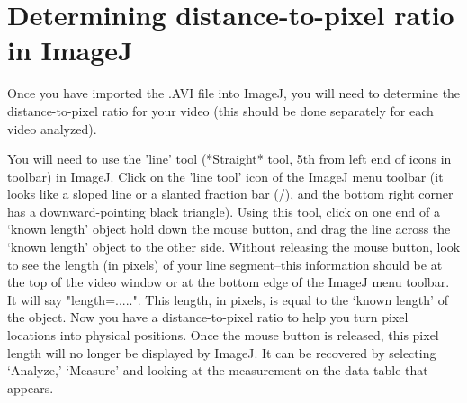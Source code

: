 \section*{Determining distance-to-pixel ratio in ImageJ}
Once you have imported the .AVI file into ImageJ, you will need to determine the distance-to-pixel ratio for your video (this should be done separately for each video analyzed). 
\par 
You will need to use the 'line' tool (*Straight* tool, 5th from left end of icons in toolbar) in ImageJ. 
Click on the 'line tool' icon of the ImageJ menu toolbar (it looks like a sloped line or a slanted fraction bar (/), and the bottom right corner has a downward-pointing black triangle). 
Using this tool, click on one end of a ‘known length’ object hold down the mouse button, and drag the line across the ‘known length’ object to the other side. 
Without releasing the mouse button, look to see the length (in pixels) of your line segment--this information should be at the top of the video window or at the bottom edge of the ImageJ menu toolbar. 
It will say "length=.....". 
This length, in pixels, is equal to the ‘known length’ of the object. 
Now you have a distance-to-pixel ratio to help you turn pixel locations into physical positions. 
Once the mouse button is released, this pixel length will no longer be displayed by ImageJ. 
It can be recovered by selecting ‘Analyze,’ ‘Measure’ and looking at the measurement on the data table that appears.